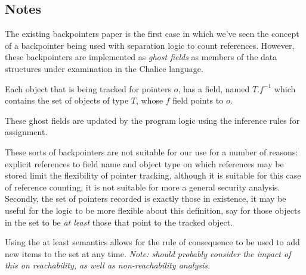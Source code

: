 \documentclass[a4paper]{article}
\begin{document}
\subsection{Notes}
The existing backpointers paper\cite{KassiosKritikos12} is the first case in
which we've seen the concept of a backpointer being used with separation logic
to count references. However, these backpointers are implemented as \emph{ghost
fields} as members of the data structures under examination in the Chalice
language.

Each object that is being tracked for pointers $o$, has a field, named $T.f^{-1}$
which contains the set of objects of type $T$, whose $f$ field
points to $o$.

These ghost fields are updated by the program logic using the inference rules
for assignment.

These sorts of backpointers are not suitable for our use for a number of
reasons: explicit references to field name and object type on
which references may be stored limit the flexibility of pointer tracking,
although it is suitable for this case of reference counting, it is not suitable
for more a general security analysis. Secondly, the set of pointers recorded is
exactly those in existence, it may be useful for the logic to be more flexible
about this definition, say for those objects in the set to be \emph{at least}
those that point to the tracked object.

Using the at least semantics allows for the rule of consequence to be used to
add new items to the set at any time. \emph{Note: should probably consider the
impact of this on reachability, as well as non-reachability analysis.}



\end{document}
